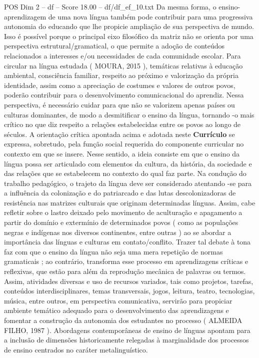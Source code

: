 \begin{textsample}{POS Dim 2 – df – Score 18.00 – df/df\_ef\_10.txt}
Da mesma forma, o ensino-aprendizagem de uma nova língua também pode contribuir para uma progressiva autonomia do educando que lhe propicie ampliação de sua perspectiva de mundo.
Isso é possível porque o principal eixo filosófico da matriz não se orienta por uma perspectiva estrutural/gramatical, o que permite a adoção de conteúdos relacionados a interesses e/ou necessidades de cada comunidade escolar.
Para circular na língua estudada ( MOURA, 2015 ), temáticas relativas à educação ambiental, consciência familiar, respeito ao próximo e valorização da própria identidade, assim como a apreciação de costumes e valores de outros povos, poderão contribuir para o desenvolvimento comunicacional do aprendiz.
Nessa perspectiva, é necessário cuidar para que não se valorizem apenas países ou culturas dominantes, de modo a desmitificar o ensino da língua, tornando -o mais crítico no que diz respeito a relações estabelecidas entre os povos ao longo de séculos.
A orientação crítica apontada acima e adotada neste \textbf{Currículo} se expressa, sobretudo, pela função social requerida do componente curricular no contexto em que se insere.
Nesse sentido, a ideia consiste em que o ensino da língua possa ser articulado com elementos da cultura, da história, da sociedade e das relações que se estabelecem no contexto do qual faz parte.
Na condução do trabalho pedagógico, o trajeto da língua deve ser considerado atentando -se para a influência da colonização e do patriarcado e das lutas descolonizadoras de resistência nas matrizes culturais que originam determinadas línguas.
Assim, cabe refletir sobre o lastro deixado pelo movimento de aculturação e apagamento a partir do domínio e extermínio de determinados povos ( como as populações negras e indígenas nos diversos continentes, entre outras ) ao se abordar a importância das línguas e culturas em contato/conflito.
Trazer tal debate à tona faz com que o ensino da língua não seja uma mera repetição de normas gramaticais ; ao contrário, transforma esse processo em aprendizagens críticas e reflexivas, que estão para além da reprodução mecânica de palavras ou termos.
Assim, atividades diversas e uso de recursos variados, tais como projetos, tarefas, conteúdos interdisciplinares, temas transversais, jogos, leitura, teatro, tecnologias, música, entre outros, em perspectiva comunicativa, servirão para propiciar ambiente temático adequado para o desenvolvimento das aprendizagens e fomentar a construção da autonomia dos estudantes no processo ( ALMEIDA FILHO, 1987 ).
Abordagens contemporâneas de ensino de línguas apontam para a inclusão de dimensões historicamente relegadas à marginalidade dos processos de ensino centrados no caráter metalinguístico.

\end{textsample}
